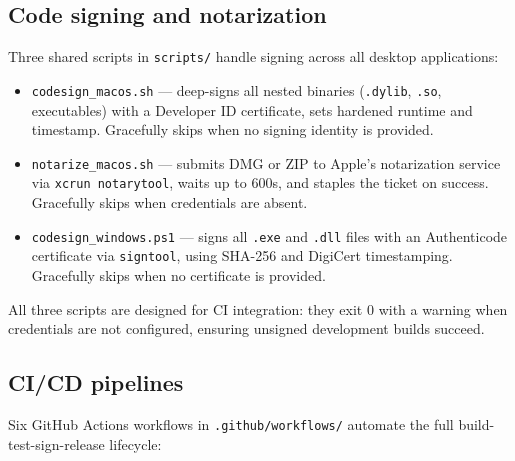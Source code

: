 \documentclass[11pt,letterpaper]{article}
\newcommand{\file}[1]{\texttt{#1}}
\begin{document}
\subsection{Code signing and notarization}

Three shared scripts in \file{scripts/} handle signing across all desktop applications:

\begin{itemize}[leftmargin=1.5em,itemsep=0.1em]
  \item \file{codesign\_macos.sh} --- deep-signs all nested binaries (\texttt{.dylib}, \texttt{.so}, executables) with a Developer ID certificate, sets hardened runtime and timestamp. Gracefully skips when no signing identity is provided.
  \item \file{notarize\_macos.sh} --- submits DMG or ZIP to Apple's notarization service via \texttt{xcrun notarytool}, waits up to 600s, and staples the ticket on success. Gracefully skips when credentials are absent.
  \item \file{codesign\_windows.ps1} --- signs all \texttt{.exe} and \texttt{.dll} files with an Authenticode certificate via \texttt{signtool}, using SHA-256 and DigiCert timestamping. Gracefully skips when no certificate is provided.
\end{itemize}

All three scripts are designed for CI integration: they exit 0 with a warning when credentials are not configured, ensuring unsigned development builds succeed.

\subsection{CI/CD pipelines}

Six GitHub Actions workflows in \file{.github/workflows/} automate the full build-test-sign-release lifecycle:
\end{document}
